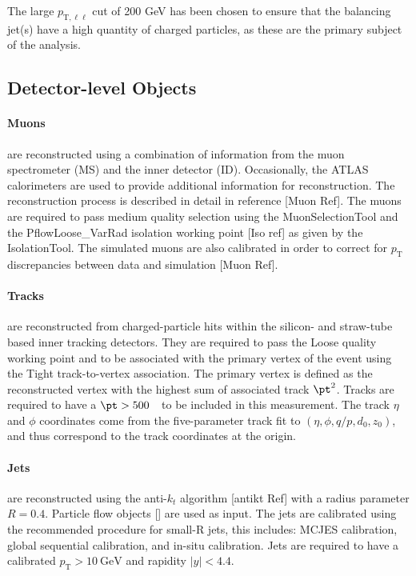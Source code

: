 The large $p_{\text{T},\ell\ell}$ cut of 200 GeV has been chosen to ensure that the balancing jet(s) have a high quantity of charged particles, as these are the primary subject of the analysis.

\subsection{Detector-level Objects}

\paragraph{Muons} are reconstructed using a combination of information from the muon spectrometer (MS) and the inner detector (ID). Occasionally, the ATLAS calorimeters are used to provide additional information for reconstruction. The reconstruction process is described in detail in reference [Muon Ref].
The muons are required to pass medium quality selection using the MuonSelectionTool and the PflowLoose\_VarRad isolation working point [Iso ref] as given by the IsolationTool. The simulated muons are also calibrated in order to correct for $p_\text{T}$ discrepancies between data and simulation [Muon Ref].

\paragraph{Tracks} are reconstructed from charged-particle hits within the silicon- and straw-tube based inner tracking detectors. They are required to pass the Loose quality working point and to be associated with the primary vertex of the event using the Tight track-to-vertex association.  The primary vertex is defined  as the reconstructed vertex with the highest sum of associated track $\pt^2$.  Tracks are required to have a $\pt>500$~\MeV~to be included in this measurement.  The track $\eta$ and $\phi$ coordinates come from the five-parameter track fit to $(\eta,\phi,q/p,d_0,z_0)$, and thus correspond to the track coordinates at the origin.

\paragraph{Jets} are reconstructed using the anti-$k_t$ algorithm [antikt Ref] with a radius parameter $R=0.4$. Particle flow objects [] are used as input. The jets are calibrated using the recommended procedure for small-R jets, this includes: MCJES calibration, global sequential calibration, and in-situ calibration.
Jets are required to have a calibrated $p_\text{T} > 10~\text{GeV}$ and rapidity $|y| < 4.4$.

